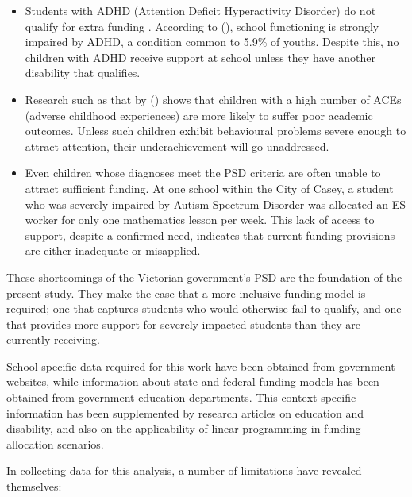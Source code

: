 \documentclass[11pt, a4paper]{article}
\begin{document}
    \begin{itemize}
        \item Students with ADHD (Attention Deficit Hyperactivity Disorder) do not qualify for extra funding \parencite{psd_guidelines}. According to  (), school functioning is strongly impaired by ADHD, a condition common to 5.9\% of youths. Despite this, no children with ADHD receive support at school unless they have another disability that qualifies.
        \item Research such as that by  () shows that children with a high number of ACEs (adverse childhood experiences) are more likely to suffer poor academic outcomes. Unless such children exhibit behavioural problems severe enough to attract attention, their underachievement will go unaddressed.
        \item Even children whose diagnoses meet the PSD criteria are often unable to attract sufficient funding. At one school within the City of Casey, a student who was severely impaired by Autism Spectrum Disorder was allocated an ES worker for only one mathematics lesson per week. This lack of access to support, despite a confirmed need, indicates that current funding provisions are either inadequate or misapplied.
    \end{itemize}

    These shortcomings of the Victorian government's PSD are the foundation of the present study. They make the case that a more inclusive funding model is required; one that captures students who would otherwise fail to qualify, and one that provides more support for severely impacted students than they are currently receiving.

    School-specific data required for this work have been obtained from government websites, while information about state and federal funding models has been obtained from government education departments. This context-specific information has been supplemented by research articles on education and disability, and also on the applicability of linear programming in funding allocation scenarios.

    In collecting data for this analysis, a number of limitations have revealed themselves:
\end{document}
